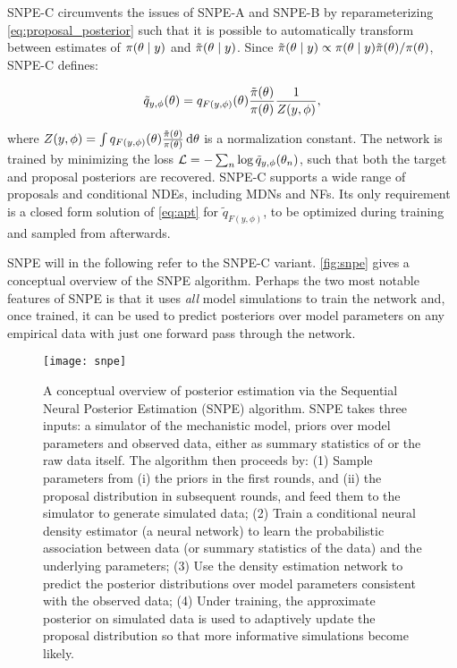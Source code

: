SNPE-C circumvents the issues of SNPE-A and SNPE-B by reparameterizing \autoref{eq:proposal_posterior} such that it is possible to automatically transform between estimates of $\pi \qty(\theta \mid y)$ and $\tilde{\pi} \qty(\theta \mid y)$. Since $\tilde{\pi}(\theta \mid y) \propto \pi \qty(\theta \mid y) \tilde{\pi}(\theta)/\pi \qty(\theta)$, SNPE-C defines:

\begin{equation}\label{eq:apt}
    \tilde{q}_{y, \phi} (\theta) = q_{F(y, \phi)} (\theta) \frac{\tilde{\pi}(\theta)}{\pi \qty(\theta)} \frac{1}{Z(y, \phi)},
\end{equation}

where $Z(y, \phi) = \int q_{F(y, \phi)} (\theta) \frac{\tilde{\pi}(\theta)}{\pi \qty(\theta)} \dd{\theta}$ is a normalization constant. The network is trained by minimizing the loss $\mathcal{L} = - \sum_n \log \tilde{q}_{y, \phi} \qty(\theta_n)$, such that both the target and proposal posteriors are recovered. SNPE-C supports a wide range of proposals and conditional NDEs, including MDNs and NFs. Its only requirement is a closed form solution of \autoref{eq:apt} for $\tilde{q}_{F(y, \phi)}$, to be optimized during training and sampled from afterwards.  

SNPE will in the following refer to the SNPE-C variant. \autoref{fig:snpe} gives a conceptual overview of the SNPE algorithm. Perhaps the two most notable features of SNPE is that it uses \textit{all} model simulations to train the network and, once trained, it can be used to predict posteriors over model parameters on any empirical data with just one forward pass through the network.

\begin{figure}[!htb]
    \centering
    \texttt{[image: snpe]}
    \caption{A conceptual overview of posterior estimation via the Sequential Neural Posterior Estimation (SNPE) algorithm. SNPE takes three inputs: a simulator of the mechanistic model, priors over model parameters and observed data, either as summary statistics of or the raw data itself. The algorithm then proceeds by: (1) Sample parameters from (i) the priors in the first rounds, and (ii) the proposal distribution in subsequent rounds, and feed them to the simulator to generate simulated data; (2) Train a conditional neural density estimator (a neural network) to learn the probabilistic association between data (or summary statistics of the data) and the underlying parameters; (3) Use the density estimation network to predict the posterior distributions over model parameters consistent with the observed data; (4) Under training, the approximate posterior on simulated data is used to adaptively update the proposal distribution so that more informative simulations become likely.
    }
    \label{fig:snpe}
\end{figure}














    


